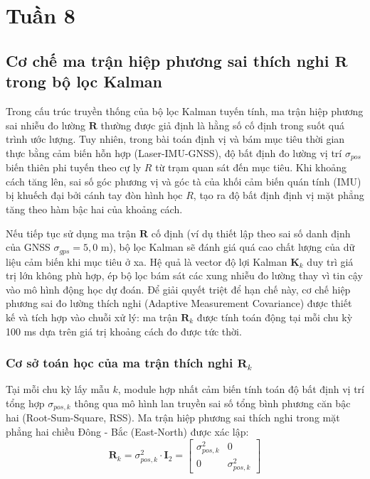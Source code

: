 \section{Tuần 8}

\subsection{Cơ chế ma trận hiệp phương sai thích nghi \texorpdfstring{$\mathbf{R}$}{R} trong bộ lọc Kalman}

\hspace{0.5cm} Trong cấu trúc truyền thống của bộ lọc Kalman tuyến tính, ma trận hiệp phương sai nhiễu đo lường $\mathbf{R}$ thường được giả định là hằng số cố định trong suốt quá trình ước lượng. Tuy nhiên, trong bài toán định vị và bám mục tiêu thời gian thực bằng cảm biến hỗn hợp (Laser-IMU-GNSS), độ bất định đo lường vị trí $\sigma_{pos}$ biến thiên phi tuyến theo cự ly $R$ từ trạm quan sát đến mục tiêu. Khi khoảng cách tăng lên, sai số góc phương vị và góc tà của khối cảm biến quán tính (IMU) bị khuếch đại bởi cánh tay đòn hình học $R$, tạo ra độ bất định định vị mặt phẳng tăng theo hàm bậc hai của khoảng cách.

Nếu tiếp tục sử dụng ma trận $\mathbf{R}$ cố định (ví dụ thiết lập theo sai số danh định của GNSS $\sigma_{gps} = 5{,}0$ m), bộ lọc Kalman sẽ đánh giá quá cao chất lượng của dữ liệu cảm biến khi mục tiêu ở xa. Hệ quả là vector độ lợi Kalman $\mathbf{K}_k$ duy trì giá trị lớn không phù hợp, ép bộ lọc bám sát các xung nhiễu đo lường thay vì tin cậy vào mô hình động học dự đoán. Để giải quyết triệt để hạn chế này, cơ chế hiệp phương sai đo lường thích nghi (Adaptive Measurement Covariance) được thiết kế và tích hợp vào chuỗi xử lý: ma trận $\mathbf{R}_k$ được tính toán động tại mỗi chu kỳ 100 ms dựa trên giá trị khoảng cách đo được tức thời.

\subsubsection{Cơ sở toán học của ma trận thích nghi \texorpdfstring{$\mathbf{R}_k$}{Rk}}

\hspace{0.5cm} Tại mỗi chu kỳ lấy mẫu $k$, module hợp nhất cảm biến tính toán độ bất định vị trí tổng hợp $\sigma_{pos,k}$ thông qua mô hình lan truyền sai số tổng bình phương căn bậc hai (Root-Sum-Square, RSS). Ma trận hiệp phương sai thích nghi trong mặt phẳng hai chiều Đông - Bắc (East-North) được xác lập:
\begin{equation}
\mathbf{R}_k = \sigma_{pos,k}^2 \cdot \mathbf{I}_2 = \begin{bmatrix} \sigma_{pos,k}^2 & 0 \\ 0 & \sigma_{pos,k}^2 \end{bmatrix}
\label{eq:adaptive-r-definition}
\end{equation}

